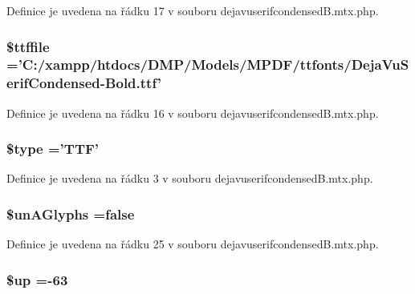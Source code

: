 Definice je uvedena na řádku 17 v souboru dejavuserifcondensed\-B.\-mtx.\-php.

\hypertarget{dejavuserifcondensed_b_8mtx_8php_ab04cc39aa4badf22904a8e6ec08f49a9}{
\subsubsection[{\$ttffile}]{\setlength{\rightskip}{0pt plus 5cm}\$ttffile ='C\-:/xampp/htdocs/D\-M\-P/Models/M\-P\-D\-F/ttfonts/Deja\-Vu\-Serif\-Condensed-\/Bold.\-ttf'}}\label{dejavuserifcondensed_b_8mtx_8php_ab04cc39aa4badf22904a8e6ec08f49a9}


Definice je uvedena na řádku 16 v souboru dejavuserifcondensed\-B.\-mtx.\-php.

\hypertarget{dejavuserifcondensed_b_8mtx_8php_a9a4a6fba2208984cabb3afacadf33919}{
\subsubsection[{\$type}]{\setlength{\rightskip}{0pt plus 5cm}\$type ='T\-T\-F'}}\label{dejavuserifcondensed_b_8mtx_8php_a9a4a6fba2208984cabb3afacadf33919}


Definice je uvedena na řádku 3 v souboru dejavuserifcondensed\-B.\-mtx.\-php.

\hypertarget{dejavuserifcondensed_b_8mtx_8php_a0306ade62464a165fe9fa56306f6dd17}{
\subsubsection[{\$un\-A\-Glyphs}]{\setlength{\rightskip}{0pt plus 5cm}\$un\-A\-Glyphs ={\bf false}}}\label{dejavuserifcondensed_b_8mtx_8php_a0306ade62464a165fe9fa56306f6dd17}


Definice je uvedena na řádku 25 v souboru dejavuserifcondensed\-B.\-mtx.\-php.

\hypertarget{dejavuserifcondensed_b_8mtx_8php_a6b5ad2ac55f9df46e8f34e78fbd6f176}{
\subsubsection[{\$up}]{\setlength{\rightskip}{0pt plus 5cm}\$up =-\/63}}\label{dejavuserifcondensed_b_8mtx_8php_a6b5ad2ac55f9df46e8f34e78fbd6f176}



